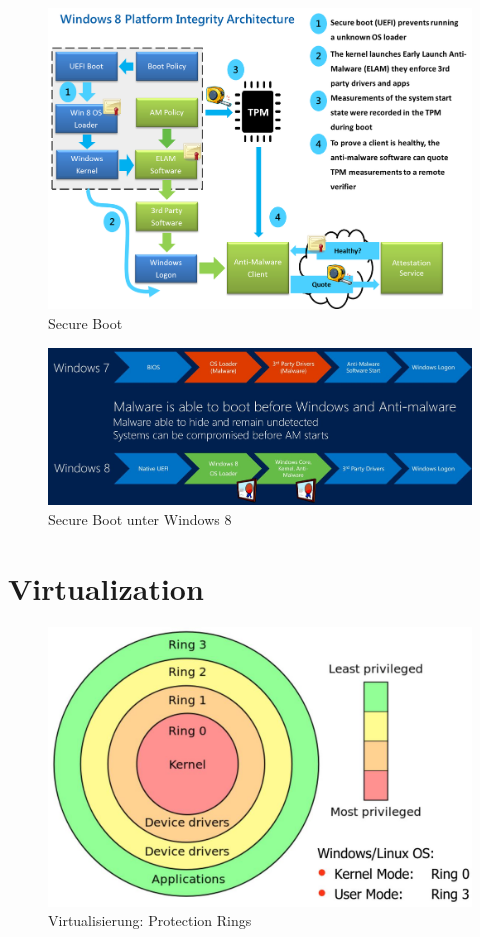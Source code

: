 \begin{figure}[h!]
	\centering
	\includegraphics[width=0.8\linewidth]{images/secureboot}
	\caption{Secure Boot}
	\label{fig:secureboot}
\end{figure}
\begin{figure}[h!]
	\centering
	\includegraphics[width=0.9\linewidth]{images/secure_boot}
	\caption{Secure Boot unter Windows 8}
	\label{fig:secureboot}
\end{figure}


\section{Virtualization}
\begin{figure}[h]
\centering
\includegraphics[width=0.5\linewidth]{images/virtualization_rings}
\caption{Virtualisierung: Protection Rings}
\label{fig:virtualizationrings}
\end{figure}

